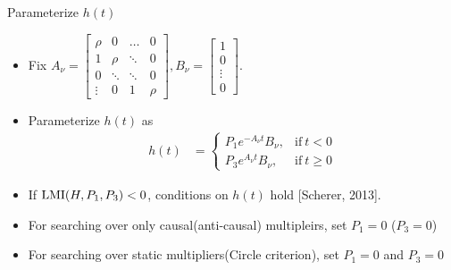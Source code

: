 \documentclass{beamer}
\begin{document}
\begin{frame}{Parameterize $h(t)$}	
	
\begin{itemize}
\item Fix $A_{\nu}=
\begin{bmatrix} 
	\rho   & 0      &\dots     & 0 \\
	1      & \rho   & \ddots        &0  \\
	0      & \ddots      & \ddots     &0  \\
	\vdots & 0      & 1        &\rho  
\end{bmatrix},
B_{\nu}=
\begin{bmatrix} 
	1 \\
	0\\
	\vdots\\
	0 
\end{bmatrix}.$
\item Parameterize $h(t)$ as  
\begin{equation}\label{eq:h_defn}
	\begin{split}
		h(t)&=
		\begin{cases}
			P_1 e^{-A_{\nu}t}B_{\nu}, & \text{if}\ t<0 \\
			P_3 e^{A_{\nu}t}B_{\nu}, & \text{if}\ t\geq 0
		\end{cases}
	\end{split}
\end{equation}
\item If $\textnormal{LMI}(H,P_1,P_3)<0$, conditions on $h(t)$ hold [Scherer, 2013].
\item For searching over only causal(anti-causal) multipleirs, set $P_1=0$ ($P_3=0$)
\item For searching over static multipliers(Circle criterion), set $P_1=0$ and $P_3=0$
\end{itemize}
	
	
	
	
\end{frame}
\end{document}
